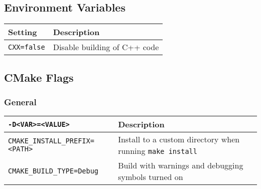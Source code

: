 \subsection{Environment Variables}
\begin{table}[h!]
\centering
\begin{tabularx}{1.2\textwidth}{| l | X |}
  \hline
  Setting & Description \\
  \hline
  \texttt{CXX=false} & Disable building of C++ code \\
  \hline
\end{tabularx}
\end{table}

\subsection{CMake Flags}

\subsubsection{General}
\begin{table}[h!]
\centering
\begin{tabularx}{1.2\textwidth}{| l | X |}
  \hline
  \texttt{-D<VAR>=<VALUE>} & Description \\
  \hline
  \texttt{CMAKE\_INSTALL\_PREFIX=<PATH>}
  & Install to a custom directory when running \texttt{make install} \\
  \hline
  \texttt{CMAKE\_BUILD\_TYPE=Debug}
  & Build with warnings and debugging symbols turned on \\
  \hline
\end{tabularx}
\end{table}

